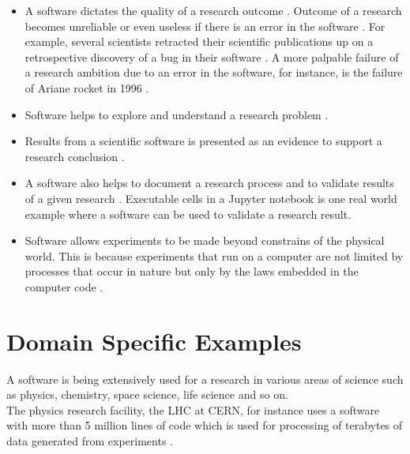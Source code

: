 \begin{itemize}%
	\itemsep0em
	\item A software dictates the quality of a research outcome \citep{hannay2009scientists}. Outcome of a research becomes unreliable or even useless if there is an error in the software \citep{soergel2014rampant}. For example, several scientists retracted their scientific publications up on a retrospective discovery of a bug in their software \citep{wilson2014best,merali2010computational,miller2006scientist}. A more palpable failure of a research ambition due to an error in the software, for instance, is the failure of Ariane rocket in 1996 \citep{enwiki:1054482061}.  
	\item Software helps to explore and understand a research problem \citep{hannay2009scientists}.
	\item Results from a scientific software is presented as an evidence to support a research conclusion \citep{kanewala2014testing}. 
	
  
	
	\item A software also helps to document a research process and to validate results of a given research \citep{jay2020software}. Executable cells in a Jupyter notebook is one real world example where a software can be used to validate a research result.
	
	\item Software allows experiments to be made beyond constrains of the physical world. This is because experiments that run on a computer are not limited by processes that occur in nature but only by the laws embedded in the computer code \citep{wolfram1984computer}. 

\end{itemize}

\section{Domain Specific Examples}
\label{sec:Roles:Domain}

A software is being extensively used for a research in various areas of science such as physics, chemistry, space science, life science and so on.\\

The physics research facility, the \ac{LHC} at \ac{CERN}, for instance uses a software with more than 5 million lines of code which is used for processing of terabytes of data generated from experiments \citep{storer2017bridging}.\\


